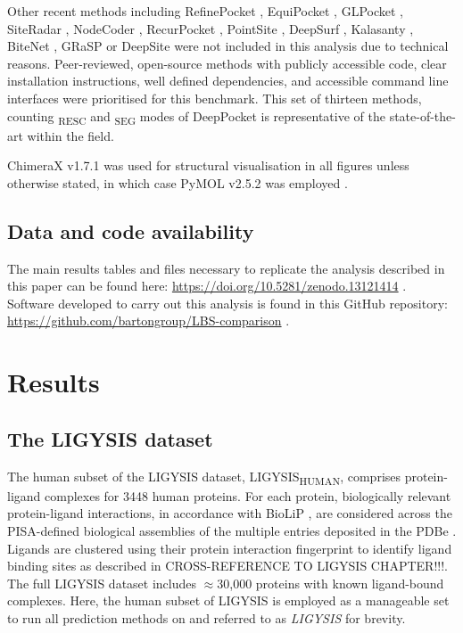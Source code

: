 Other recent methods including RefinePocket \cite{LIU_2023_REFINEPOCKET}, EquiPocket \cite{ZHANG_2024_EQUIPOCKET}, GLPocket \cite{LI_2023_GLPOCKET}, SiteRadar \cite{EVTEEV_2023_SITERADAR}, NodeCoder \cite{ABDOLLAHI_2023_NODECODER}, RecurPocket \cite{LI_2022_RECURPOCKET}, PointSite \cite{YAN_2022_POINTSITE}, DeepSurf \cite{MYOLNAS_2021_DEEPSURF}, Kalasanty \cite{STEPNIEWSKA_2020_KALASANTY}, BiteNet \cite{KOZLOVSKII_2020_BITENET}, GRaSP \cite{SANTANA_2020_GRaSP} or DeepSite \cite{JIMENEZ_2017_DEEPSITE} were not included in this analysis due to technical reasons. Peer-reviewed, open-source methods with publicly accessible code, clear installation instructions, well defined dependencies, and accessible command line interfaces were prioritised for this benchmark. This set of thirteen methods, counting \textsubscript{RESC} and \textsubscript{SEG} modes of DeepPocket is representative of the state-of-the-art within the field.

ChimeraX v1.7.1 \cite{PETTERSEN_2021_CHIMERAX} was used for structural visualisation in all figures unless otherwise stated, in which case PyMOL v2.5.2 was employed \cite{SCHRODINGER_2015_PYMOL}.

\subsection{Data and code availability}

The main results tables and files necessary to replicate the analysis described in this paper can be found here: \url{https://doi.org/10.5281/zenodo.13121414} \cite{UTGES_2024_LBSCOMP_ZENODO}. Software developed to carry out this analysis is found in this GitHub repository: \url{https://github.com/bartongroup/LBS-comparison} \cite{UTGES_2024_LBSCOMP_REPO}.

\section{Results}

\subsection{The LIGYSIS dataset}

The human subset of the LIGYSIS dataset, LIGYSIS\textsubscript{HUMAN}, comprises protein-ligand complexes for 3448 human proteins. For each protein, biologically relevant protein-ligand interactions, in accordance with BioLiP \cite{YANG_2013_BIOLIP}, are considered across the PISA-defined \cite{KRISSINEL_2007_PISA} biological assemblies of the multiple entries deposited in the PDBe \cite{ARMSTRONG_2020_PDBE}. Ligands are clustered using their protein interaction fingerprint to identify ligand binding sites as described in CROSS-REFERENCE TO LIGYSIS CHAPTER!!!. The full LIGYSIS dataset includes $\approx$30,000 proteins with known ligand-bound complexes. Here, the human subset of LIGYSIS is employed as a manageable set to run all prediction methods on and referred to as \textit{LIGYSIS} for brevity.

